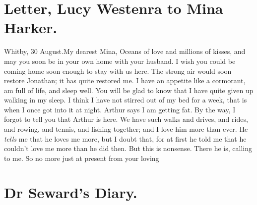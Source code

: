 \section{Letter, Lucy Westenra to Mina Harker.}

\begin{mail}{Whitby, 30 August.}{My dearest Mina,}
Oceans of love and millions of kisses, and may you soon be in your own home with your husband. I wish you could be coming home soon enough to stay with us here. The strong air would soon restore Jonathan; it has quite restored me. I have an appetite like a cormorant, am full of life, and sleep well. You will be glad to know that I have quite given up walking in my sleep. I think I have not stirred out of my bed for a week, that is when I once got into it at night. Arthur says I am getting fat. By the way, I forgot to tell you that Arthur is here. We have such walks and drives, and rides, and rowing, and tennis, and fishing together; and I love him more than ever. He \textit{tells} me that he loves me more, but I doubt that, for at first he told me that he couldn't love me more than he did then. But this is nonsense. There he is, calling to me. So no more just at present from your loving
	
	
\end{mail}



\section{Dr Seward's Diary.}

